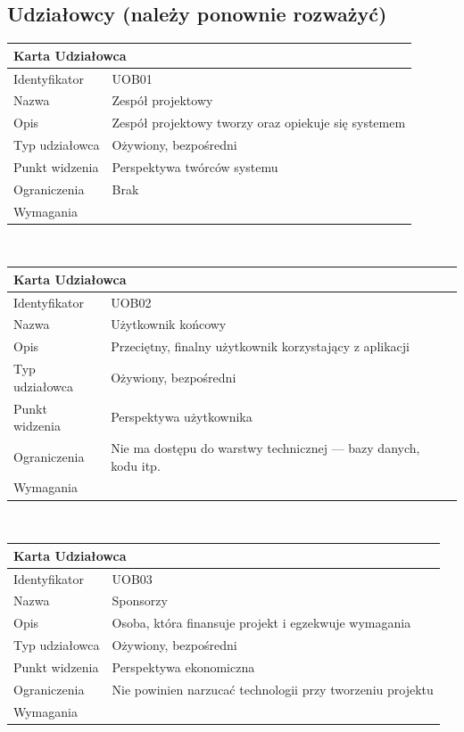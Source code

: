 \documentclass[a4paper,11pt]{report}
\begin{document}
\subsection {Udziałowcy (należy ponownie rozważyć)}
\begin{tabular}{|p{3cm}|p{11cm}|}
	\hline
	\multicolumn{2}{|l|}{\textbf{Karta Udziałowca}}\\
	\hline
	Identyfikator&UOB01\\
	\hline
	Nazwa&Zespół projektowy\\
	\hline
	Opis&Zespół projektowy tworzy oraz opiekuje się systemem\\
	\hline
	Typ udziałowca&Ożywiony, bezpośredni\\
	\hline
	Punkt widzenia&Perspektywa twórców systemu\\
	\hline
	Ograniczenia&Brak\\
	\hline
	Wymagania&\\
	\hline
	\end{tabular}\\
	\begin{tabular}{|p{3cm}|p{11cm}|}
	\hline
	\multicolumn{2}{|l|}{\textbf{Karta Udziałowca}}\\
	\hline
	Identyfikator&UOB02\\
	\hline
	Nazwa&Użytkownik końcowy\\
	\hline
	Opis&Przeciętny, finalny użytkownik korzystający z aplikacji\\
	\hline
	Typ udziałowca&Ożywiony, bezpośredni\\
	\hline
	Punkt widzenia&Perspektywa użytkownika\\
	\hline
	Ograniczenia&Nie ma dostępu do warstwy technicznej — bazy danych, kodu itp.\\
	\hline
	Wymagania&\\
	\hline
	\end{tabular}\\
	\begin{tabular}{|p{3cm}|p{11cm}|}
	\hline
	\multicolumn{2}{|l|}{\textbf{Karta Udziałowca}}\\
	\hline
	Identyfikator&UOB03\\
	\hline
	Nazwa&Sponsorzy\\
	\hline
	Opis&Osoba, która finansuje projekt i egzekwuje wymagania\\
	\hline
	Typ udziałowca&Ożywiony, bezpośredni\\
	\hline
	Punkt widzenia&Perspektywa ekonomiczna\\
	\hline
	Ograniczenia&Nie powinien narzucać technologii przy tworzeniu projektu\\
	\hline
	Wymagania&\\
	\hline
	\end{tabular}\\
\end{document}
